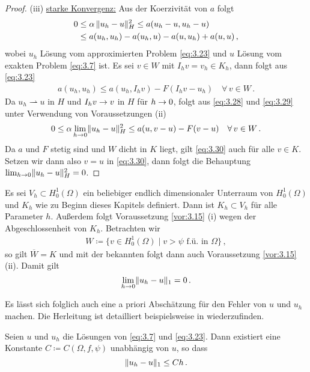\begin{proof}
(iii) \underline{starke Konvergenz:} Aus der Koerzivität von $a$ folgt
\begin{align}\label{eq:3.28}
	\begin{aligned}
		0 &\le \alpha \, \lVert u_h-u\rVert_H^2 \le a(u_h-u,u_h-u) \\
		& \le a(u_h,u_h)-a(u_h,u)-a(u,u_h)+a(u,u) \, ,
	\end{aligned}
\end{align}
wobei $u_h$ Lösung vom approximierten Problem \eqref{eq:3.23} und $u$ Lösung vom exakten Problem \eqref{eq:3.7} ist. Es sei $v \in W$ mit $I_h v = v_h \in K_h$, dann folgt aus \eqref{eq:3.23}
\begin{align}\label{eq:3.29}
	a(u_h,u_h) \le a(u_h,I_h v) - F(I_h v-u_h) \quad \forall \, v \in W \, .
\end{align}
Da $u_h \rightharpoonup u$ in $H$ und $I_h v \rightarrow v$ in $H$ für $h \rightarrow 0$, folgt aus \eqref{eq:3.28} und \eqref{eq:3.29} unter Verwendung von Voraussetzungen (ii)
\begin{align}\label{eq:3.30}
	0 \le \alpha \lim_{h\rightarrow 0} \lVert u_h-u\rVert^2_H \le a(u,v-u)-F(v-u) \quad \forall \, v \in W \, .
\end{align}
Da $a$ und $F$ stetig sind und $W$ dicht in $K$ liegt, gilt \eqref{eq:3.30} auch für alle $v \in K$. Setzen wir dann also $v = u$ in \eqref{eq:3.30}, dann folgt die Behauptung $\lim_{h\rightarrow 0} \lVert u_h - u \rVert_H^2 = 0$. 
\end{proof}


Es sei $V_h \subset H^1_0(\Omega)$ ein beliebiger endlich dimensionaler Unterraum von $H^1_0(\Omega)$ und $K_h$ wie zu Beginn dieses Kapitels definiert. Dann ist $K_h \subset V_h$ für alle Parameter $h$. Außerdem folgt Voraussetzung \ref{vor:3.15} (i) wegen der Abgeschlossenheit von $K_h$. Betrachten wir
\begin{align*}
	W \coloneqq \{v \in H^1_0(\Omega) \mid v > \psi \text{ f.ü. in } \Omega\} \, ,
\end{align*}
so gilt $\overline W = K$ und mit der bekannten  folgt dann auch Voraussetzung \ref{vor:3.15} (ii). Damit gilt
\[
	\lim_{h\rightarrow 0} \lVert u_h-u\rVert_1 = 0\, .
\]


Es lässt sich folglich auch eine a priori Abschätzung für den Fehler von $u$ und $u_h$ machen. Die Herleitung ist detailliert beispielsweise in \cite{Falk} wiederzufinden.


\begin{theorem}\label{theorem:3.17}
Seien $u$ und $u_h$ die Lösungen von \eqref{eq:3.7} und \eqref{eq:3.23}. Dann existiert eine Konstante $C \coloneqq C(\Omega, f, \psi)$ unabhängig von $u$, so dass
\[
	\lVert u_h-u\rVert_1 \le C h \, .
\]
\end{theorem}

